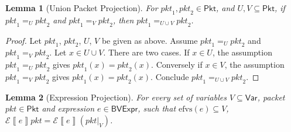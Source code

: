 \documentclass{article}
\newcommand{\pkt}{\mathit{pkt}}
\newcommand{\denote}[1]{\left\llbracket#1\right\rrbracket}
\newcommand{\edenote}[1]{\mathcal{E}\denote{#1}}
\newcommand{\BVExpr}{\mathsf{BVExpr}}
\newcommand{\Pkt}{\mathsf{Pkt}}
\newcommand{\Var}{\mathsf{Var}}
\newcommand{\efvs}{\textrm{efvs}}
\theoremstyle{plain}
\newtheorem{lemma}{Lemma}
\theoremstyle{definition}
\theoremstyle{remark}
\begin{document}
\begin{lemma}[Union Packet Projection]
  \label{lem:union-pkt-proj}
  For $\pkt_1,\pkt_2 \in \Pkt$, and $U, V \subseteq \Pkt$, if $\pkt_1 =_U
  \pkt_2$ and $\pkt_1 =_V \pkt_2$, then $\pkt_1 =_{U \cup V} \pkt_2$.
\end{lemma}

\begin{proof}
  Let $\pkt_1$, $\pkt_2$, $U$, $V$ be given as above. Assume $\pkt_1 =_U \pkt_2$
  and $\pkt_1 =_V \pkt_2$. Let $x \in U \cup V$. There are two cases. If $x \in
  U$, the assumption $\pkt_1 =_U \pkt_2 $ gives $\pkt_1(x) = \pkt_2(x)$.
  Conversely if $x \in V$, the assumption $\pkt_1 =_V \pkt_2$ gives $\pkt_1(x) =
  \pkt_2(x)$. Conclude $\pkt_1 =_{U \cup V} \pkt_2$.
\end{proof}

\begin{lemma}[Expression Projection]
  \label{lem:proj-expr}
  For every set of variables $V \subseteq \Var$, packet $\pkt \in \Pkt$ and
  expression $e \in \BVExpr$, such that $\efvs(e) \subseteq V$, $\edenote{e}\pkt =
  \edenote{e}(\pkt|_V)$.
\end{lemma}
\end{document}
